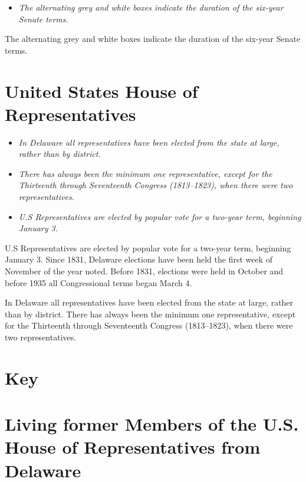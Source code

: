\begin{itemize}
\item
  \emph{The alternating grey and white boxes indicate the duration of
  the six-year Senate terms.}
\end{itemize}

The alternating grey and white boxes indicate the duration of the
six-year Senate terms.

\section{United States House of
Representatives}\label{united-states-house-of-representatives}

\begin{itemize}
\item
  \emph{In Delaware all representatives have been elected from the state
  at large, rather than by district.}
\item
  \emph{There has always been the minimum one representative, except for
  the Thirteenth through Seventeenth Congress (1813--1823), when there
  were two representatives.}
\item
  \emph{U.S Representatives are elected by popular vote for a two-year
  term, beginning January 3.}
\end{itemize}

U.S Representatives are elected by popular vote for a two-year term,
beginning January 3. Since 1831, Delaware elections have been held the
first week of November of the year noted. Before 1831, elections were
held in October and before 1935 all Congressional terms began March 4.

In Delaware all representatives have been elected from the state at
large, rather than by district. There has always been the minimum one
representative, except for the Thirteenth through Seventeenth Congress
(1813--1823), when there were two representatives.

\section{Key}\label{key}

\section{Living former Members of the U.S. House of Representatives from
Delaware}\label{living-former-members-of-the-u.s.-house-of-representatives-from-delaware}

